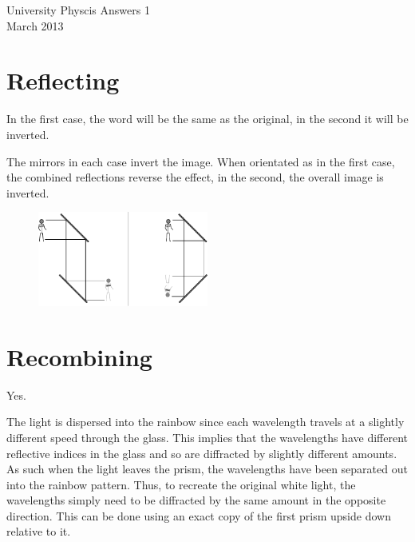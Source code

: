 
\makeatletter
\renewcommand{\@maketitle}{
\newpage
 \null
 \vskip 2em%
 \begin{center}%
  {\Large \@title \par}%
 \end{center}%
 \par} \makeatother

\begin{center}
\Huge University Physcis Answers 1\\[1em]
\large March 2013
\end{center}
\setcounter{section}{0}

\section{Reflecting} %
	\label{sec:reflecting_ans}
	In the first case, the word will be the same as the original, in the second it will be inverted.

	The mirrors in each case invert the image. When orientated as in the first case, the combined reflections reverse the effect, in the second, the overall image is inverted.
	\begin{figure}[ht]
		\centering
		\includegraphics[width=0.5\textwidth]{periscopes_answers.pdf}
	\end{figure}

\section{Recombining} %
	\label{sec:recombining_ans}

	Yes.

	The light is dispersed into the rainbow since each wavelength travels at a slightly different speed through the glass. This implies that the wavelengths have different reflective indices in the glass and so are diffracted by slightly different amounts. As such when the light leaves the prism, the wavelengths have been separated out into the rainbow pattern. Thus, to recreate the original white light, the wavelengths simply need to be diffracted by the same amount in the opposite direction. This can be done using an exact copy of the first prism upside down relative to it.

